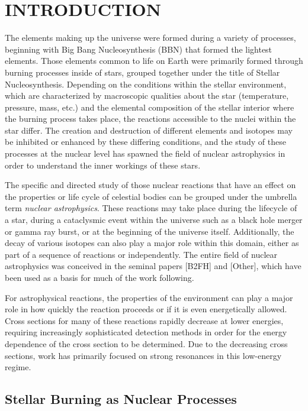\chapter{INTRODUCTION}

The elements making up the universe were formed during a variety of processes,
beginning with Big Bang Nucleosynthesis (BBN) that formed the lightest
elements. Those elements common to life on Earth were primarily formed through
burning processes inside of stars, grouped together under the title of
Stellar Nucleosynthesis. Depending on the conditions within the stellar
environment, which are characterized by macroscopic qualities about the star
(temperature, pressure, mass, etc.) and the elemental composition of the
stellar interior where the burning process takes place, the reactions
accessible to the nuclei within the star differ. The creation and destruction
of different elements and isotopes may be inhibited or enhanced by these
differing conditions, and the study of these processes at the nuclear level
has spawned the field of nuclear astrophysics in order to understand the inner
workings of these stars.

The specific and directed study of those nuclear reactions that have an effect
on the properties or life cycle of celestial bodies can be grouped under the
umbrella term \emph{nuclear astrophysics}. These reactions may take place
during the lifecycle of a star, during a cataclysmic event within the universe
such as a black hole merger or gamma ray burst, or at the beginning of the
universe itself. Additionally, the decay of various isotopes can also play a
major role within this domain, either as part of a sequence of reactions or
independently. The entire field of nuclear astrophysics was conceived in the
seminal papers [B2FH] and [Other], which have been used as a basis for much of
the work following.

For astrophysical reactions, the properties of the environment can play a major
role in how quickly the reaction proceeds or if it is even energetically
allowed. Cross sections for many of these reactions rapidly decrease at lower
energies, requiring increasingly sophisticated detection methods in order for
the energy dependence of the cross section to be determined. Due to the
decreasing cross sections, work has primarily focused on strong resonances in
this low-energy regime.

\section{Stellar Burning as Nuclear Processes}

